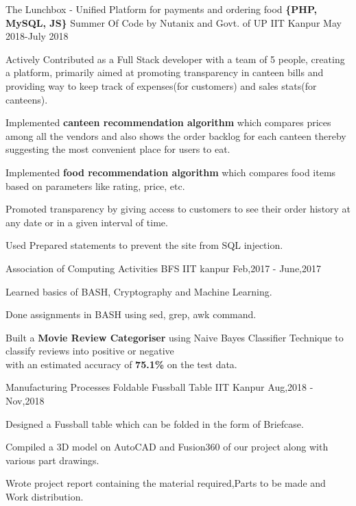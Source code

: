 
\begin{cventries}

  \cventry
  {The Lunchbox - Unified Platform for payments and ordering food \textbf{\{PHP, MySQL, JS\}}}
  {Summer Of Code by Nutanix and Govt. of UP}
  {IIT Kanpur}
  {May 2018-July 2018}
  {
    \begin{cvitems}
     \item Actively Contributed as a Full Stack developer with a team of 5 people, creating a platform, primarily aimed at promoting transparency in canteen bills and providing way to keep track of expenses(for customers) and sales stats(for canteens). 
     \item Implemented \textbf{canteen recommendation algorithm} which compares prices among all the vendors and also shows the order backlog for each canteen thereby suggesting the most convenient place for users to eat. 
     \item Implemented \textbf{food recommendation algorithm} which compares food items based on parameters like rating, price, etc.
     \item Promoted transparency by giving access to customers to see their order history at any date or in a given interval of time. 
     \item Used Prepared statements to prevent the site from SQL injection.
    \end{cvitems}
  }

  \cventry
  {Association of Computing Activities}
  {BFS}
  {IIT kanpur}
  {Feb,2017 - June,2017}
  {
     \begin{cvitems}
      \item Learned basics of BASH, Cryptography and Machine Learning.
      \item Done assignments in BASH using sed, grep, awk command.
      \item Built a \textbf{Movie Review Categoriser} using Naive Bayes Classifier Technique
            to classify reviews into positive or negative\\ with an estimated accuracy of \textbf{75.1\%} on the test data.
     \end{cvitems}
  }

  \cventry 
  {Manufacturing Processes}
  {Foldable Fussball Table}
  {IIT Kanpur}
  {Aug,2018 - Nov,2018}
  {
    \begin{cvitems}
      \item Designed a Fussball table which can be folded in the form of Briefcase.
      \item Compiled a 3D model on AutoCAD and Fusion360 of our project along with various part drawings.
      \item Wrote project report containing the material required,Parts to be made and Work distribution.
    \end{cvitems}
  }


\end{cventries}
